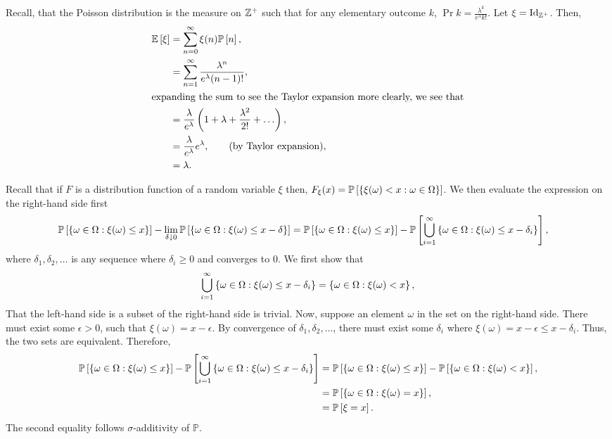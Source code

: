 \begin{solution}
    Recall, that the Poisson distribution is the measure on $\mathbb{Z}^+$ such that for
    any elementary outcome $k$, $\Pr{k} = \frac{\lambda^k}{e^\lambda k!}$. Let
    $\xi = \operatorname{Id}_{\mathbb{Z}^+}$. Then, 
    \begin{align*}
        \mathbb{E}\left[\xi\right] &= \sum_{n=0}^\infty \xi(n)\mathbb{P}\left[n\right], \\
        &= \sum_{n=1}^\infty \frac{\lambda^n}{e^\lambda (n-1)!}, \\
        \intertext{expanding the sum to see the Taylor expansion more clearly, we see that}
        &= \frac{\lambda}{e^\lambda}\left(1 + \lambda + \frac{\lambda^2}{2!} + \ldots \right), \\
        &= \frac{\lambda}{e^\lambda}e^\lambda, \tag{by Taylor expansion}, \\
        &= \lambda.
    \end{align*}
\end{solution}
\begin{problem}{9}
\end{problem}
\begin{solution}
    Recall that if $F$ is a distribution function of a random variable $\xi$
    then, $F_\xi(x) = \mathbb{P}\left[\left\{ \xi(\omega) < x: \omega \in \Omega \right\}\right]$. We then evaluate the expression on the right-hand side first 
    \begin{align*}
        \mathbb{P}\left[\left\{ \omega \in \Omega: \xi(\omega) \leq x \right\}\right] - \lim_{\delta \downarrow 0} \mathbb{P}\left[\left\{ \omega \in \Omega: \xi(\omega) \leq x-\delta \right\}\right] &= \mathbb{P}\left[\left\{ \omega \in \Omega: \xi(\omega) \leq x \right\}\right] - \mathbb{P}\left[\bigcup_{i=1}^\infty \left\{ \omega \in \Omega: \xi(\omega) \leq x - \delta_i \right\}\right],
    \end{align*}
    where $\delta_1, \delta_2, \ldots$ is any sequence where $\delta_i \geq 0$ and converges to 0. We first show that \[\bigcup_{i=1}^\infty \left\{ \omega \in \Omega: \xi(\omega) \leq x - \delta_i \right\} = \left\{ \omega \in \Omega: \xi(\omega) < x \right\},\] 
    That the left-hand side is a subset of the right-hand side is trivial. Now, suppose an element $\omega$ in the set on the right-hand side. There must exist some $\epsilon > 0$, such that $\xi(\omega) = x - \epsilon$. By convergence of $\delta_1,\delta_2,\ldots$, there must exist some $\delta_i$ where $\xi(\omega) = x - \epsilon \leq x - \delta_i$. Thus, the two sets are equivalent. Therefore, 
    \begin{align*}
        \mathbb{P}\left[\left\{ \omega \in \Omega: \xi(\omega) \leq x \right\}\right] - \mathbb{P}\left[\bigcup_{i=1}^\infty \left\{ \omega \in \Omega: \xi(\omega) \leq x - \delta_i \right\}\right] &= \mathbb{P}\left[\left\{ \omega \in \Omega: \xi(\omega) \leq x \right\}\right] - \mathbb{P}\left[\left\{ \omega \in \Omega: \xi(\omega) < x \right\}\right], \\
        &= \mathbb{P}\left[\left\{ \omega \in \Omega: \xi(\omega) = x \right\}\right], \\
        &= \mathbb{P}\left[\xi = x\right].
    \end{align*}
    The second equality follows $\sigma$-additivity of $\mathbb{P}$.
\end{solution}
